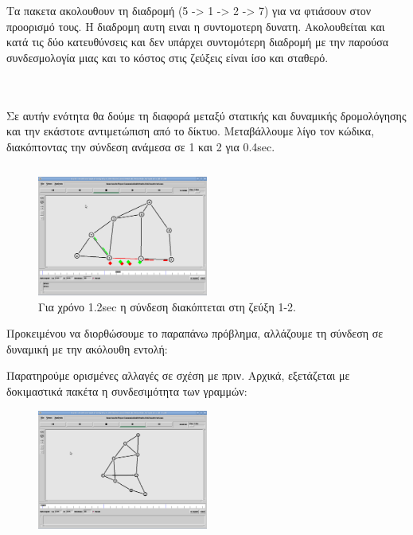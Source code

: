 \documentclass[a4paper,9pt]{article}
\begin{document}
Τα πακετα ακολουθουν τη διαδρομή (5 -> 1 ->  2 -> 7)
για να φτιάσουν στον προορισμό τους. Η διαδρομη αυτη ειναι η συντομοτερη
δυνατη. Ακολουθείται και κατά τις δύο κατευθύνσεις και δεν υπάρχει συντομότερη
διαδρομή με την παρούσα συνδεσμολογία μιας και το κόστος στις ζεύξεις είναι
ίσο και σταθερό.


\inputminted[fontsize=\scriptsize]{tcl}{files/ex3_1.tcl}
\section{}
Σε αυτήν ενότητα θα δούμε τη διαφορά μεταξύ στατικής και δυναμικής
δρομολόγησης και την εκάστοτε αντιμετώπιση από το δίκτυο. Μεταβάλλουμε λίγο
τον κώδικα, διακόπτοντας την σύνδεση ανάμεσα σε 1 και 2 για 0.4sec.

\inputminted[fontsize=\scriptsize]{tcl}{files/ex3_2.tcl}

\begin{figure}[h]
    \centering
    \includegraphics[width=0.5\textwidth]{files/3.png}
    \caption{Για χρόνο 1.2sec η σύνδεση διακόπτεται στη ζεύξη 1-2.}
\end{figure}


Προκειμένου να διορθώσουμε το παραπάνω πρόβλημα, αλλάζουμε τη σύνδεση σε
δυναμική με την ακόλουθη εντολή:

Παρατηρούμε ορισμένες αλλαγές σε σχέση με πριν. Αρχικά, εξετάζεται με
δοκιμαστικά πακέτα η συνδεσιμότητα των γραμμών:
\begin{figure}[h]
    \centering
    \includegraphics[width=0.5\textwidth]{files/4.png}
\end{figure}
\end{document}
